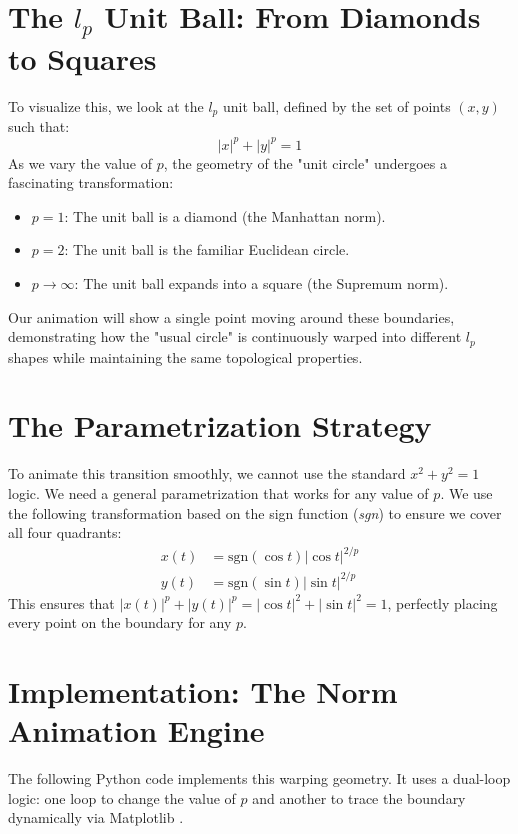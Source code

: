 \documentclass[12pt, a4paper]{report}
\begin{document}
\section{The $l_p$ Unit Ball: From Diamonds to Squares}

To visualize this, we look at the $l_p$ unit ball, defined by the set of points $(x, y)$ such that:
\begin{equation}
    |x|^p + |y|^p = 1
\end{equation}
As we vary the value of $p$, the geometry of the "unit circle" undergoes a fascinating transformation:
\begin{itemize}
    \item \textbf{$p=1$}: The unit ball is a diamond (the Manhattan norm).
    \item \textbf{$p=2$}: The unit ball is the familiar Euclidean circle.
    \item \textbf{$p \to \infty$}: The unit ball expands into a square (the Supremum norm).
\end{itemize}

Our animation will show a single point moving around these boundaries, demonstrating how the "usual circle" is continuously warped into different $l_p$ shapes while maintaining the same topological properties.

\section{The Parametrization Strategy}

To animate this transition smoothly, we cannot use the standard $x^2 + y^2 = 1$ logic. We need a general parametrization that works for any value of $p$. We use the following transformation based on the sign function (\textit{sgn}) to ensure we cover all four quadrants:
\begin{align}
    x(t) &= \text{sgn}(\cos t) |\cos t|^{2/p} \\
    y(t) &= \text{sgn}(\sin t) |\sin t|^{2/p}
\end{align}
This ensures that $|x(t)|^p + |y(t)|^p = |\cos t|^2 + |\sin t|^2 = 1$, perfectly placing every point on the boundary for any $p$.

\section{Implementation: The Norm Animation Engine}

The following Python code \cite{python_docs} implements this warping geometry. It uses a dual-loop logic: one loop to change the value of $p$ and another to trace the boundary dynamically via Matplotlib \cite{matplotlib_docs}.
\end{document}
